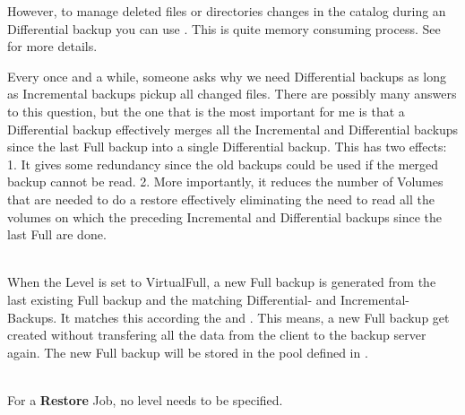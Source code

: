 {\begin{description}
\begin{description}
However, to manage deleted files or directories changes in the
catalog during an Differential backup you can use .
This is quite memory consuming process. See  for more details.

Every once and a while, someone asks why we need Differential
backups as long as Incremental backups pickup all changed files.
There are possibly many answers to this question, but the one
that is the most important for me is that a Differential backup
effectively merges
all the Incremental and Differential backups since the last Full backup
into a single Differential backup.  This has two effects: 1.  It gives
some redundancy since the old backups could be used if the merged backup
cannot be read.  2.  More importantly, it reduces the number of Volumes
that are needed to do a restore effectively eliminating the need to read
all the volumes on which the preceding Incremental and Differential
backups since the last Full are done.

\item [VirtualFull] \hfill \\
%
\label{VirtualFull}%
When the Level is set to VirtualFull, a new Full backup is generated from the last existing Full backup and the matching Differential- and Incremental-Backups. 
It matches this according the
 and .
This means, a new Full backup get created without transfering all the data from the client to the backup server again.
The new Full backup will be stored in the pool defined in .



\end{description}

    \item [Restore] \hfill \\
        For a {\bf Restore} Job, no level needs to be specified.


\end{description}}
